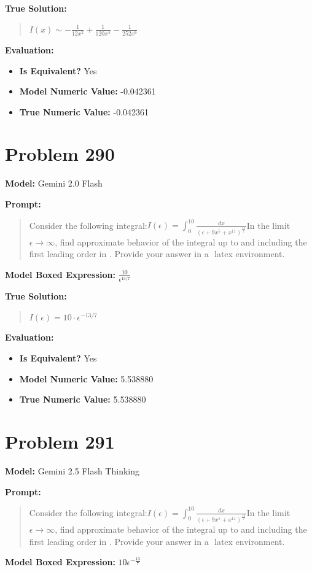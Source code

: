 \documentclass{article}
\begin{document}
{\textbf{True Solution:}
\begin{quote}
$I(x) \sim -\frac{1}{12x^2} + \frac{1}{120x^4} - \frac{1}{252x^6}$
\end{quote}

\textbf{Evaluation:}
\begin{itemize}
\item \textbf{Is Equivalent?} Yes
\item \textbf{Model Numeric Value:} -0.042361
\item \textbf{True Numeric Value:} -0.042361
\end{itemize}
\vspace{1cm}
\section*{Problem 290}
\textbf{Model:} Gemini 2.0 Flash

\textbf{Prompt:}
\begin{quote}
Consider the following integral:$I(\epsilon) = \int_0^{10} \frac{dx}{(\epsilon + 9x^5 + x^{11})^\frac{13}{7}}$In the limit$\epsilon \to \infty$, find approximate behavior of the integral up to and including the first leading order in \epsilon. Provide your answer in a $\boxed{}$ latex environment.
\end{quote}
\textbf{Model Boxed Expression:} $\frac{10}{\epsilon^{13/7}}$

\textbf{True Solution:}
\begin{quote}
$I(\epsilon) = 10\cdot\epsilon^{-13/7}$
\end{quote}

\textbf{Evaluation:}
\begin{itemize}
\item \textbf{Is Equivalent?} Yes
\item \textbf{Model Numeric Value:} 5.538880
\item \textbf{True Numeric Value:} 5.538880
\end{itemize}
\vspace{1cm}
\section*{Problem 291}
\textbf{Model:} Gemini 2.5 Flash Thinking

\textbf{Prompt:}
\begin{quote}
Consider the following integral:$I(\epsilon) = \int_0^{10} \frac{dx}{(\epsilon + 9x^5 + x^{11})^\frac{13}{7}}$In the limit$\epsilon \to \infty$, find approximate behavior of the integral up to and including the first leading order in \epsilon. Provide your answer in a $\boxed{}$ latex environment.
\end{quote}
\textbf{Model Boxed Expression:} $10\epsilon^{-\frac{13}{7}}$

}
\end{document}

